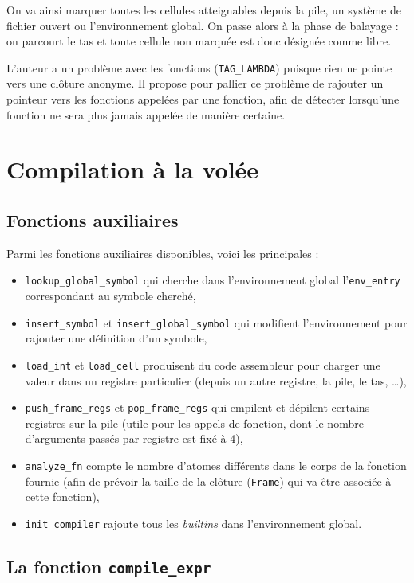 \documentclass[a4paper, 10pt, french]{article}
\newcommand{\codeC}[1]{\texttt{#1}}
\newcommand{\foreign}[1]{\emph{#1}}
\begin{document}
On va ainsi marquer toutes les cellules atteignables depuis la pile, un système de fichier ouvert ou l'environnement global. On passe alors à la phase de balayage : on parcourt le tas et toute cellule non marquée est donc désignée comme libre.

L'auteur a un problème avec les fonctions (\codeC{TAG_LAMBDA}) puisque rien ne pointe vers une clôture anonyme. Il propose pour pallier ce problème de rajouter un pointeur vers les fonctions appelées par une fonction, afin de détecter lorsqu'une fonction ne sera plus jamais appelée de manière certaine.


\section{Compilation à la volée}

\subsection{Fonctions auxiliaires}

Parmi les fonctions auxiliaires disponibles, voici les principales :
\begin{itemize}
  \item \codeC{lookup_global_symbol} qui cherche dans l'environnement global l'\codeC{env_entry} correspondant au symbole cherché,
  \item \codeC{insert_symbol} et \codeC{insert_global_symbol} qui modifient l'environnement pour rajouter une définition d'un symbole,
  \item \codeC{load_int} et \codeC{load_cell} produisent du code assembleur pour charger une valeur dans un registre particulier (depuis un autre registre, la pile, le tas, \ldots),
  \item \codeC{push_frame_regs} et \codeC{pop_frame_regs} qui empilent et dépilent certains registres sur la pile (utile pour les appels de fonction, dont le nombre d'arguments passés par registre est fixé à 4),
  \item \codeC{analyze_fn} compte le nombre d'atomes différents dans le corps de la fonction fournie (afin de prévoir la taille de la clôture (\codeC{Frame}) qui va être associée à cette fonction),
  \item \codeC{init_compiler} rajoute tous les \foreign{builtins} dans l'environnement global.
\end{itemize}

\subsection{La fonction \codeC{compile_expr}}
\end{document}
